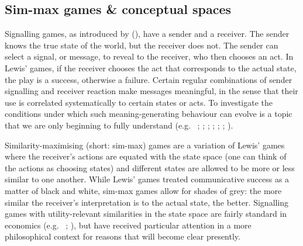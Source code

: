 \documentclass[11pt,english]{article}
\numberwithin{equation}{section}
\newcommand{\citetbjps}[1]{\citeauthor{#1} (\citeyear{#1})}
\newcommand{\citealtbjps}[1]{\citeauthor{#1} \citeyear{#1}}
\begin{document}
\subsection{Sim-max games \& conceptual spaces}

Signalling games, as introduced by \citetbjps{Lewis_1969:Convention}, have
a sender and a receiver. The sender knows the true state of the world,
but the receiver does not. The sender can select a signal, or message,
to reveal to the receiver, who then chooses an act. In Lewis' games,
if the receiver chooses the act that corresponds to the actual state,
the play is a success, otherwise a failure. Certain regular
combinations of sender signalling and receiver reaction make messages
meaningful, in the sense that their use is correlated systematically
to certain states or acts. To investigate the conditions under which
such meaning-generating behaviour can evolve is a
topic that we are only beginning to fully understand
(e.g.~\citealtbjps{Warneryd1993:Cheap-Talk-Coor}; \citealtbjps{BlumeKim1993:Evolutionary-St}; \citealtbjps{Huttegger2007:Evolution-and-t}; \citealtbjps{Pawlowitsch2008:Why-Evolution-d}; \citealtbjps{Barrett2009:The-Evolution-o}; \citealtbjps{HutteggerSkyrms2010:Evolutionary-Dy}; \citealtbjps{Skyrms2010:Signals}).

Similarity-maximising (short: sim-max) games are a variation of Lewis' games where the
receiver's actions are equated with the state space (one can think of the actions as choosing
states) and different states are allowed to be more or less similar to one another. While
Lewis' games treated communicative success as a matter of black and white, sim-max games allow
for shades of grey: the more similar the receiver's interpretation is to the actual state, the
better. Signalling games with utility-relevant similarities in the state space are fairly
standard in economics
(e.g.~\citealtbjps{Spence1973:Job-market-sign}; \citealtbjps{CrawfordSobel1982:Strategic-Infor}), but have received
particular attention in a more philosophical context for reasons that will become clear
presently.
\end{document}
